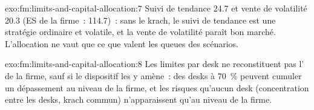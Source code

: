 \begin{solution}{exo:fm:limits-and-capital-allocation:7}
Suivi de tendance 24.7 et vente de volatilité 20.3 (ES de la firme~: 114.7)~: sans le krach, le suivi de tendance est une stratégie ordinaire et volatile, et la vente de volatilité paraît bon marché.
L'allocation ne vaut que ce que valent les queues des scénarios.
\end{solution}

\begin{solution}{exo:fm:limits-and-capital-allocation:8}
Les limites par desk ne reconstituent pas l' de la firme, sauf si le dispositif les y amène~: des desks à 70~\% peuvent cumuler un dépassement au niveau de la firme, et les risques qu'aucun desk
(concentration entre les desks, krach commun) n'apparaissent qu'au niveau de la firme.
\end{solution}

